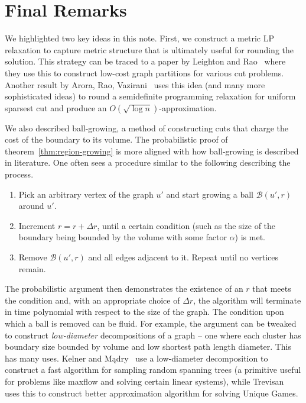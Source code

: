 \section{Final Remarks}

We highlighted two key ideas in this note. First, we construct a metric LP relaxation to capture metric structure that is ultimately useful for rounding the solution. This strategy can be traced to a paper by Leighton and Rao~\cite{LR88}\cite{LR99} where they use this to construct low-cost graph partitions for various cut problems. Another result by Arora, Rao, Vazirani~\cite{ARV09} uses this idea (and many more sophisticated ideas) to round a semidefinite programming relaxation for uniform sparsest cut and produce an $O(\sqrt{\log n})$-approximation.

We also described ball-growing, a method of constructing cuts that charge the cost of the boundary to its volume. The probabilistic proof of theorem~\ref{thm:region-growing} is more aligned with how ball-growing is described in literature. One often sees a procedure similar to the following describing the process.
\vspace{-1em}
\begin{enumerate}[1.]
\item Pick an arbitrary vertex of the graph $u'$ and start growing a ball $\mathcal{B}(u', r)$ around $u'$.

\item Increment $r = r + \Delta r$, until a certain condition (such as the size of the boundary being bounded by the volume with some factor $\alpha$) is met.

\item Remove $\mathcal{B}(u', r)$ and all edges adjacent to it. Repeat until no vertices remain.
\end{enumerate}

The probabilistic argument then demonstrates the existence of an $r$ that meets the condition and, with an appropriate choice of $\Delta r$, the algorithm will terminate in time polynomial with respect to the size of the graph. The condition upon which a ball is removed can be fluid. For example, the argument can be tweaked to construct \emph{low-diameter} decompositions of a graph -- one where each cluster has boundary size bounded by volume and low shortest path length diameter. This has many uses. Kelner and M\k{a}dry~\cite{KM09} use a low-diameter decomposition to construct a fast algorithm for sampling random spanning trees (a primitive useful for problems like maxflow and solving certain linear systems), while Trevisan~\cite{Tre05} uses this to construct better approximation algorithm for solving Unique Games.
